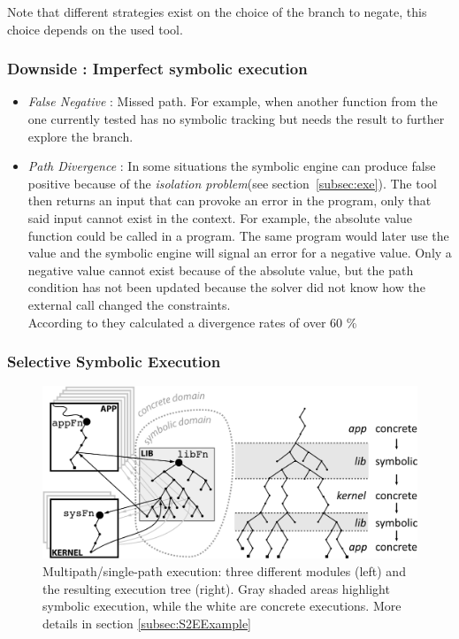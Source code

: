 \documentclass[11pt, conference]{IEEEtran}
\begin{document}
  			Note that different strategies exist on the choice of the branch to negate, this choice depends on the used tool.\\

  		\subsubsection*{Downside : Imperfect symbolic execution}
  			\begin{itemize} %
  				\item \emph{False Negative} : Missed path. For example, when another function from the one currently tested has no symbolic tracking but needs the result to further explore the branch.
  				\item \emph{Path Divergence} : In some situations the symbolic engine can produce false positive because of the \emph{isolation problem}(see section~\ref{subsec:exe}). The tool then returns an input that can provoke an error in the program, only that said input cannot exist in the context. For example, the absolute value function could be called in a program. The same program would later use the value and the symbolic engine will signal an error for a negative value. Only a negative value cannot exist because of the absolute value, but the path condition has not been updated because the solver did not know how the external call changed the constraints. \\ %
  				According to \cite{Godefroid2008AutomatedWF} they calculated a divergence rates of over 60 \%
  			\end{itemize}

    	\subsubsection{Selective Symbolic Execution}
    	\label{subsec:selectiveSymbolicExec}

    		\begin{figure}
    			\centering
    			\includegraphics[scale=0.9]{selectiveSymbolicExecExample.png}
    			\caption{Multipath/single-path execution: three different modules (left) and the resulting execution tree (right). Gray shaded areas highlight symbolic execution, while the white are concrete executions. More details in section \ref{subsec:S2EExample}}
    			\label{fig:selectiveSymbolicExample}
    		\end{figure}
\end{document}
